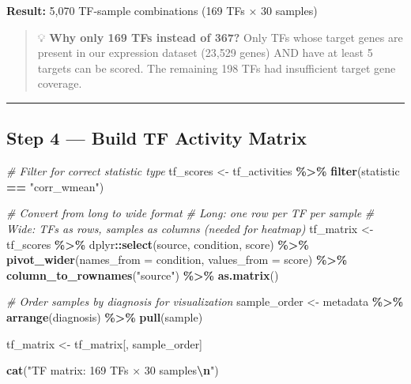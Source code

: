 \documentclass[
]{article}
\newenvironment{Shaded}{\begin{snugshade}}{\end{snugshade}}
\newcommand{\AttributeTok}[1]{\textcolor[rgb]{0.13,0.29,0.53}{#1}}
\newcommand{\CommentTok}[1]{\textcolor[rgb]{0.56,0.35,0.01}{\textit{#1}}}
\newcommand{\FunctionTok}[1]{\textcolor[rgb]{0.13,0.29,0.53}{\textbf{#1}}}
\newcommand{\NormalTok}[1]{#1}
\newcommand{\OtherTok}[1]{\textcolor[rgb]{0.56,0.35,0.01}{#1}}
\newcommand{\SpecialCharTok}[1]{\textcolor[rgb]{0.81,0.36,0.00}{\textbf{#1}}}
\newcommand{\StringTok}[1]{\textcolor[rgb]{0.31,0.60,0.02}{#1}}
\begin{document}
\textbf{Result:} 5,070 TF-sample combinations (169 TFs × 30 samples)

\begin{quote}
💡 \textbf{Why only 169 TFs instead of 367?} Only TFs whose target genes
are present in our expression dataset (23,529 genes) AND have at least 5
targets can be scored. The remaining 198 TFs had insufficient target
gene coverage.
\end{quote}

\begin{center}\rule{0.5\linewidth}{0.5pt}\end{center}

\subsection{Step 4 --- Build TF Activity
Matrix}\label{step-4-build-tf-activity-matrix}

\begin{Shaded}
\begin{Highlighting}[]
\CommentTok{\# Filter for correct statistic type}
\NormalTok{tf\_scores }\OtherTok{\textless{}{-}}\NormalTok{ tf\_activities }\SpecialCharTok{\%\textgreater{}\%}
    \FunctionTok{filter}\NormalTok{(statistic }\SpecialCharTok{==} \StringTok{"corr\_wmean"}\NormalTok{)}

\CommentTok{\# Convert from long to wide format}
\CommentTok{\# Long: one row per TF per sample}
\CommentTok{\# Wide: TFs as rows, samples as columns (needed for heatmap)}
\NormalTok{tf\_matrix }\OtherTok{\textless{}{-}}\NormalTok{ tf\_scores }\SpecialCharTok{\%\textgreater{}\%}
\NormalTok{    dplyr}\SpecialCharTok{::}\FunctionTok{select}\NormalTok{(source, condition, score) }\SpecialCharTok{\%\textgreater{}\%}
    \FunctionTok{pivot\_wider}\NormalTok{(}\AttributeTok{names\_from =}\NormalTok{ condition, }\AttributeTok{values\_from =}\NormalTok{ score) }\SpecialCharTok{\%\textgreater{}\%}
    \FunctionTok{column\_to\_rownames}\NormalTok{(}\StringTok{"source"}\NormalTok{) }\SpecialCharTok{\%\textgreater{}\%}
    \FunctionTok{as.matrix}\NormalTok{()}

\CommentTok{\# Order samples by diagnosis for visualization}
\NormalTok{sample\_order }\OtherTok{\textless{}{-}}\NormalTok{ metadata }\SpecialCharTok{\%\textgreater{}\%}
    \FunctionTok{arrange}\NormalTok{(diagnosis) }\SpecialCharTok{\%\textgreater{}\%}
    \FunctionTok{pull}\NormalTok{(sample)}

\NormalTok{tf\_matrix }\OtherTok{\textless{}{-}}\NormalTok{ tf\_matrix[, sample\_order]}

\FunctionTok{cat}\NormalTok{(}\StringTok{"TF matrix: 169 TFs × 30 samples}\SpecialCharTok{\textbackslash{}n}\StringTok{"}\NormalTok{)}
\end{Highlighting}
\end{Shaded}
\end{document}
